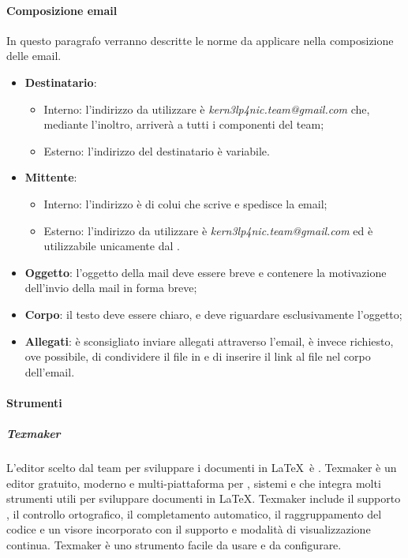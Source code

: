 \documentclass[../NormeDiProgetto_v3.0.0.tex]{subfiles}
\begin{document}
			\paragraph{Composizione email}
				In questo paragrafo verranno descritte le norme da applicare nella
				composizione delle email.
				\begin{itemize}
					\item \textbf{Destinatario}:
					\begin{itemize}
						\item Interno: l'indirizzo da utilizzare è \textit{kern3lp4nic.team@gmail.com} che, mediante l'inoltro, arriverà a tutti i componenti del team;
						\item Esterno: l'indirizzo del destinatario è variabile.
					\end{itemize}
					\item \textbf{Mittente}:
					\begin{itemize}
						\item Interno: l'indirizzo è di colui che scrive e spedisce la email;
						\item Esterno: l'indirizzo da utilizzare è \textit{kern3lp4nic.team@gmail.com} ed è utilizzabile unicamente dal \responsabilediprogetto.
					\end{itemize}
					\item \textbf{Oggetto}: l'oggetto della mail deve essere breve e contenere la motivazione dell'invio della mail in forma breve;
					\item \textbf{Corpo}: il testo deve essere chiaro, e deve riguardare esclusivamente l'oggetto;
					\item \textbf{Allegati}: è sconsigliato inviare allegati attraverso l'email, è invece richiesto, ove possibile, di condividere il file in  e di inserire il link al file nel corpo dell'email.
				\end{itemize}

			\paragraph{Strumenti}
				\subparagraph{Texmaker}
				L'editor scelto dal team per sviluppare i documenti in \LaTeX\ è . Texmaker è un editor gratuito, moderno e multi-piattaforma per , sistemi  e  che integra molti strumenti utili per sviluppare documenti in \LaTeX. Texmaker include il supporto , il controllo ortografico, il completamento automatico, il raggruppamento del codice e un visore incorporato  con il supporto  e modalità di visualizzazione continua. Texmaker è uno strumento facile da usare e da configurare.
\end{document}
